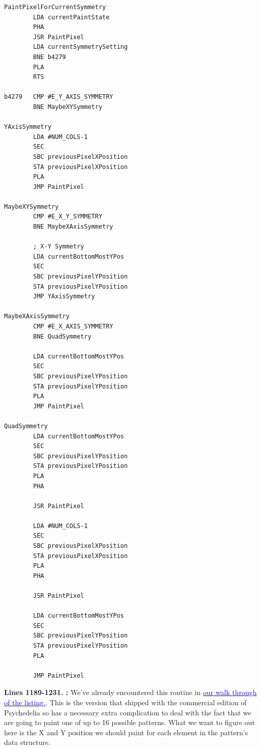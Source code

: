 \begin{lstlisting}[basicstyle=\ttfamily\tiny, caption=The routine responsible for painting patterns.]
PaintPixelForCurrentSymmetry
        LDA currentPaintState
        PHA 
        JSR PaintPixel
        LDA currentSymmetrySetting
        BNE b4279
        PLA 
        RTS 

b4279   CMP #E_Y_AXIS_SYMMETRY
        BNE MaybeXYSymmetry

YAxisSymmetry
        LDA #NUM_COLS-1
        SEC 
        SBC previousPixelXPosition
        STA previousPixelXPosition
        PLA 
        JMP PaintPixel

MaybeXYSymmetry   
        CMP #E_X_Y_SYMMETRY
        BNE MaybeXAxisSymmetry

        ; X-Y Symmetry
        LDA currentBottomMostYPos
        SEC 
        SBC previousPixelYPosition
        STA previousPixelYPosition
        JMP YAxisSymmetry

MaybeXAxisSymmetry   
        CMP #E_X_AXIS_SYMMETRY
        BNE QuadSymmetry

        LDA currentBottomMostYPos
        SEC 
        SBC previousPixelYPosition
        STA previousPixelYPosition
        PLA 
        JMP PaintPixel

QuadSymmetry   
        LDA currentBottomMostYPos
        SEC 
        SBC previousPixelYPosition
        STA previousPixelYPosition
        PLA 
        PHA 

        JSR PaintPixel

        LDA #NUM_COLS-1
        SEC 
        SBC previousPixelXPosition
        STA previousPixelXPosition
        PLA 
        PHA 

        JSR PaintPixel

        LDA currentBottomMostYPos
        SEC 
        SBC previousPixelYPosition
        STA previousPixelYPosition
        PLA 

        JMP PaintPixel
\end{lstlisting}
\clearpage

\textbf{Lines 1189-1231. :} We've already encountered this routine
in \hyperref[sec:listing_commentary]{\textcolor{blue}{ our walk through of the listing.}}. This is the version that shipped 
with the commercial edition of Psychedelia so has a necessary extra complication to deal with the fact that we 
are going to paint one of up to 16 possible patterns. What we want to figure out here is the X and Y position we should
paint for each element in the pattern's data structure.
\clearpage

